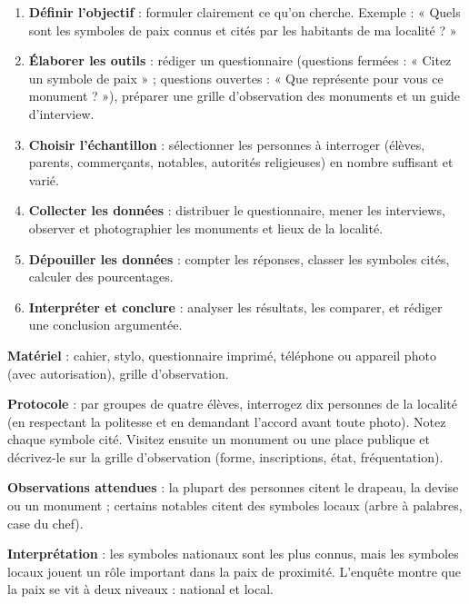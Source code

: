 \documentclass[11pt]{article}
\newcommand{\cle}[1]{{\popxbold\color{popdark}#1}}
\begin{document}
\begin{methode}
\begin{enumerate}
\item \textbf{Définir l'objectif} : formuler clairement ce qu'on cherche. Exemple : « Quels sont les symboles de paix connus et cités par les habitants de ma localité ? »
\item \textbf{Élaborer les outils} : rédiger un \cle{questionnaire} (questions fermées : « Citez un symbole de paix » ; questions ouvertes : « Que représente pour vous ce monument ? »), préparer une grille d'\cle{observation} des monuments et un guide d'\cle{interview}.
\item \textbf{Choisir l'échantillon} : sélectionner les personnes à interroger (élèves, parents, commerçants, notables, autorités religieuses) en nombre suffisant et varié.
\item \textbf{Collecter les données} : distribuer le questionnaire, mener les interviews, observer et photographier les monuments et lieux de la localité.
\item \textbf{Dépouiller les données} : compter les réponses, classer les symboles cités, calculer des pourcentages.
\item \textbf{Interpréter et conclure} : analyser les résultats, les comparer, et rédiger une conclusion argumentée.
\end{enumerate}
\end{methode}

\begin{experience}
\textbf{Matériel} : cahier, stylo, questionnaire imprimé, téléphone ou appareil photo (avec autorisation), grille d'observation.

\textbf{Protocole} : par groupes de quatre élèves, interrogez dix personnes de la localité (en respectant la politesse et en demandant l'accord avant toute photo). Notez chaque symbole cité. Visitez ensuite un monument ou une place publique et décrivez-le sur la grille d'observation (forme, inscriptions, état, fréquentation).

\textbf{Observations attendues} : la plupart des personnes citent le drapeau, la devise ou un monument ; certains notables citent des symboles locaux (arbre à palabres, case du chef).

\textbf{Interprétation} : les symboles nationaux sont les plus connus, mais les symboles locaux jouent un rôle important dans la paix de proximité. L'enquête montre que la paix se vit à deux niveaux : national et local.
\end{experience}
\end{document}
